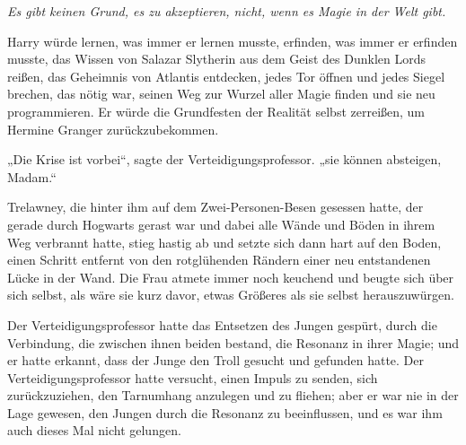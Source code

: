 \emph{Es gibt keinen Grund, es zu akzeptieren, nicht, wenn es Magie in der Welt gibt.}


Harry würde lernen, was immer er lernen musste, erfinden, was immer er erfinden musste, das Wissen von Salazar Slytherin aus dem Geist des Dunklen Lords reißen, das Geheimnis von Atlantis entdecken, jedes Tor öffnen und jedes Siegel brechen, das nötig war, seinen Weg zur Wurzel aller Magie finden und sie neu programmieren. Er würde die Grundfesten der Realität selbst zerreißen, um Hermine Granger zurückzubekommen.

\later

„Die Krise ist vorbei“, sagte der Verteidigungsprofessor.
„sie können absteigen, Madam.“

Trelawney, die hinter ihm auf dem Zwei-Personen-Besen gesessen hatte, der gerade durch Hogwarts gerast war und dabei alle Wände und Böden in ihrem Weg verbrannt hatte, stieg hastig ab und setzte sich dann hart auf den Boden, einen Schritt entfernt von den rotglühenden Rändern einer neu entstandenen Lücke in der Wand. Die Frau atmete immer noch keuchend und beugte sich über sich selbst, als wäre sie kurz davor, etwas Größeres als sie selbst herauszuwürgen.

Der Verteidigungsprofessor hatte das Entsetzen des Jungen gespürt, durch die Verbindung, die zwischen ihnen beiden bestand, die Resonanz in ihrer Magie; und er hatte erkannt, dass der Junge den Troll gesucht und gefunden hatte. Der Verteidigungsprofessor hatte versucht, einen Impuls zu senden, sich zurückzuziehen, den Tarnumhang anzulegen und zu fliehen; aber er war nie in der Lage gewesen, den Jungen durch die Resonanz zu beeinflussen, und es war ihm auch dieses Mal nicht gelungen.

